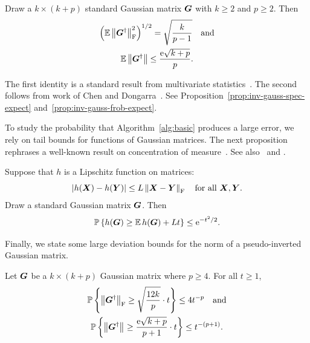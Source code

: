 \documentclass[final]{siamltex}
\newcommand{\pgnotate}[1]{{\color{blue}[#1]}}
\begin{document}

\lsp

\begin{proposition} \label{prop:gauss-inv-expect}
Draw a $k \times (k + p)$ standard Gaussian matrix $\bm{G}$ with $k \geq 2$ and $p \geq 2$.  Then
\begin{gather}
\left( \Expect \fnormsq{ \mtx{G}^\psinv } \right)^{1/2} = \sqrt{\frac{k}{p-1}}
	\quad\text{and}
    \label{eqn:avg-inv-fnormsq} \\
\Expect \norm{ \mtx{G}^\psinv } \leq \frac{\econst\sqrt{k+p}}{p}
    \label{eqn:avg-inv-specnorm}.
\end{gather}
\end{proposition}

The first identity is a standard result from multivariate
statistics~\cite[p.~96]{Mui82:Aspects-Multivariate}. The second
follows from work of Chen and
Dongarra~\cite{CD05:Condition-Numbers}.  See
Proposition~\ref{prop:inv-gauss-spec-expect}
and~\ref{prop:inv-gauss-frob-expect}.

To study the probability that Algorithm~\ref{alg:basic} produces a large error,
we rely on tail bounds for functions of Gaussian matrices. The next
proposition rephrases a well-known result on concentration of
measure~\cite[Thm.~4.5.7]{Bog98:Gaussian-Measures}. See
also~\cite[\S1.1]{LT91:Probability-Banach} and
\cite[\S5.1]{Led01:Concentration-Measure}.

\lsp

\begin{proposition} \label{prop:gauss-tail}
Suppose that $h$ is a Lipschitz function on matrices:
$$
\left\vert { h(\bm{X}) - h(\bm{Y}) } \right\vert \leq L \left\Vert { \bm{X} - \bm{Y} } \right\Vert_{\mathrm{F}}
\quad\text{for all $\bm{X}, \bm{Y}$.}
$$
Draw a standard Gaussian matrix $\bm{G}$.  Then
$$
\mathbb{P}\left\{ { h(\bm{G}) \geq \operatorname{\mathbb{E}} h(\bm{G}) + Lt } \right\} \leq \mathrm{e}^{-t^2/2}.
$$
\end{proposition}

Finally, we state some large deviation bounds for the norm of a pseudo-inverted
Gaussian matrix.

\lsp

\begin{proposition}
\label{prop:gauss-inv-tails}
Let $\bm{G}$ be a $k \times (k + p)$ Gaussian matrix where $p \geq 4$.  For all
$t \geq 1$,
\begin{gather}
\Prob{ \smnorm{\rm F}{\mtx{G}^\psinv} \geq \sqrt{\frac{12 k}{p}} \cdot t } \leq 4 t^{-p}
    \quad\text{and}
    \label{eqn:tail-inv-fnormsq} \\
\Prob{ \smnorm{}{\mtx{G}^\psinv} \geq \frac{\econst\sqrt{k+p}}{p+1} \cdot t } \leq t^{-(p+1)}.
    \label{eqn:tail-inv-specnorm}
\end{gather}
\end{proposition}
\end{document}
